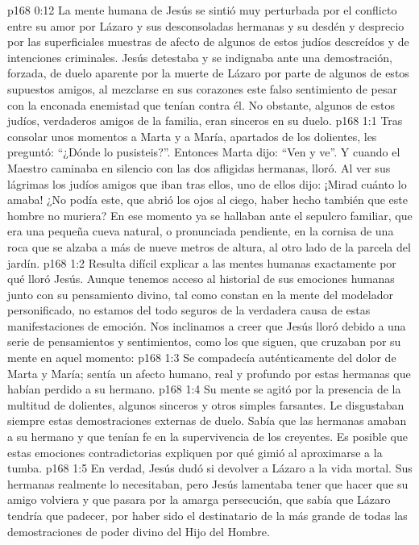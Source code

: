\vs p168 0:12 La mente humana de Jesús se sintió muy perturbada por el conflicto entre su amor por Lázaro y sus desconsoladas hermanas y su desdén y desprecio por las superficiales muestras de afecto de algunos de estos judíos descreídos y de intenciones criminales. Jesús detestaba y se indignaba ante una demostración, forzada, de duelo aparente por la muerte de Lázaro por parte de algunos de estos supuestos amigos, al mezclarse en sus corazones este falso sentimiento de pesar con la enconada enemistad que tenían contra él. No obstante, algunos de estos judíos, verdaderos amigos de la familia, eran sinceros en su duelo.
\vs p168 1:1 Tras consolar unos momentos a Marta y a María, apartados de los dolientes, les preguntó: “¿Dónde lo pusisteis?”. Entonces Marta dijo: “Ven y ve”. Y cuando el Maestro caminaba en silencio con las dos afligidas hermanas, lloró. Al ver sus lágrimas los judíos amigos que iban tras ellos, uno de ellos dijo: ¡Mirad cuánto lo amaba! ¿No podía este, que abrió los ojos al ciego, haber hecho también que este hombre no muriera? En ese momento ya se hallaban ante el sepulcro familiar, que era una pequeña cueva natural, o pronunciada pendiente, en la cornisa de una roca que se alzaba a más de nueve metros de altura, al otro lado de la parcela del jardín.
\vs p168 1:2 \pc Resulta difícil explicar a las mentes humanas exactamente por qué lloró Jesús. Aunque tenemos acceso al historial de sus emociones humanas junto con su pensamiento divino, tal como constan en la mente del modelador personificado, no estamos del todo seguros de la verdadera causa de estas manifestaciones de emoción. Nos inclinamos a creer que Jesús lloró debido a una serie de pensamientos y sentimientos, como los que siguen, que cruzaban por su mente en aquel momento:
\vs p168 1:3 Se compadecía auténticamente del dolor de Marta y María; sentía un afecto humano, real y profundo por estas hermanas que habían perdido a su hermano.
\vs p168 1:4 Su mente se agitó por la presencia de la multitud de dolientes, algunos sinceros y otros simples farsantes. Le disgustaban siempre estas demostraciones externas de duelo. Sabía que las hermanas amaban a su hermano y que tenían fe en la supervivencia de los creyentes. Es posible que estas emociones contradictorias expliquen por qué gimió al aproximarse a la tumba.
\vs p168 1:5 En verdad, Jesús dudó si devolver a Lázaro a la vida mortal. Sus hermanas realmente lo necesitaban, pero Jesús lamentaba tener que hacer que su amigo volviera y que pasara por la amarga persecución, que sabía que Lázaro tendría que padecer, por haber sido el destinatario de la más grande de todas las demostraciones de poder divino del Hijo del Hombre.
